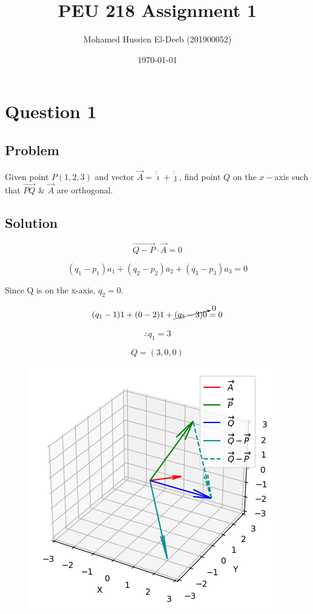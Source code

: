 \documentclass[12pt]{article}
\title{PEU 218 Assignment 1}
\author{Mohamed Hussien El-Deeb (201900052)}
\date{\today}
\begin{document}
\maketitle
\tableofcontents

\section{Question 1}

\subsection{Problem}

Given point \(P(1, 2, 3)\) and vector \(\vec{A}  = \hat{\dot{\imath}} + \hat{\dot{\jmath}}\), find point \(Q\) on the \(x-\)axis such that \(\overrightarrow{PQ} \)
\& \(\vec{A} \) are orthogonal.

\subsection{Solution}

\[\overrightarrow{Q-P} \cdot \vec{A} = 0\]

\[
    (q_1 - p_1)a_1 + (q_2 - p_2)a_2 + (q_3 - p_3)a_3 = 0
\]

Since Q is on the x-axis, \(q_2 = 0\).

\[
    (q_1 - 1)1 + (0 - 2)1 + \cancelto{0}{(q_3 - 3)0} = 0
\]

\[
    \therefore q_1 = 3
\]

\[
    Q = (3, 0, 0)
\]

\begin{figure}[H]
    \includegraphics[width=\linewidth]{Q1.png}\label{fig:Q1}
\end{figure}
\end{document}
